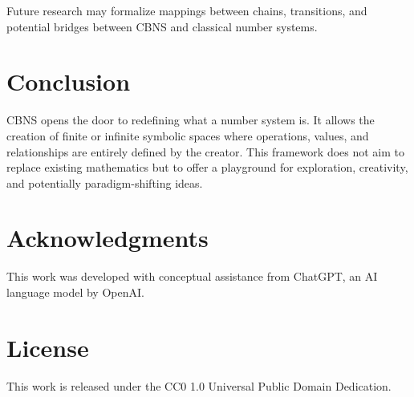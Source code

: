 \documentclass{article}
\begin{document}
Future research may formalize mappings between chains, transitions, and potential bridges between CBNS and classical number systems.

\section{Conclusion}
CBNS opens the door to redefining what a number system is. It allows the creation of finite or infinite symbolic spaces where operations, values, and relationships are entirely defined by the creator. This framework does not aim to replace existing mathematics but to offer a playground for exploration, creativity, and potentially paradigm-shifting ideas.

\section*{Acknowledgments}
This work was developed with conceptual assistance from ChatGPT, an AI language model by OpenAI.

\section*{License}
This work is released under the CC0 1.0 Universal Public Domain Dedication.
\end{document}
